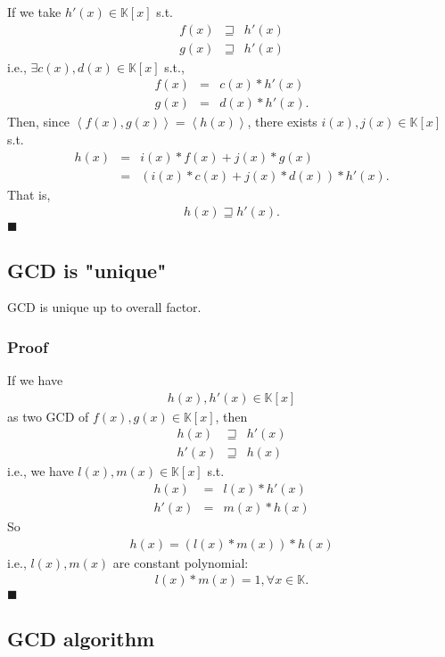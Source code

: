 \documentclass[11pt]{book}
\begin{document}
If we take $h'(x) \in \mathbb{K}[x]$ s.t.
\begin{eqnarray}
f(x) &\sqsupseteq& h'(x) \\
g(x) &\sqsupseteq& h'(x) 
\end{eqnarray}
i.e., $\exists c(x),d(x) \in \mathbb{K}[x]$ s.t.,
\begin{eqnarray}
f(x) &=& c(x) * h'(x) \\
g(x) &=& d(x) * h'(x).
\end{eqnarray}
Then, since $\left< f(x), g(x) \right> = \left< h(x)\right>$, there exists $i(x),j(x) \in \mathbb{K}[x]$ s.t.
\begin{eqnarray}
h(x) &=& i(x) * f(x) + j(x) * g(x) \\
&=& \left( i(x)*c(x) + j(x)*d(x) \right) * h'(x).
\end{eqnarray}
That is,
\begin{eqnarray}
h(x) \sqsupseteq h'(x).
\end{eqnarray}
$\blacksquare$

\subsection{GCD is "unique"}
GCD is unique up to overall factor.

\subsubsection{Proof}
If we have 
\begin{eqnarray}
h(x), h'(x) \in \mathbb{K}[x]
\end{eqnarray}
as two GCD of $f(x), g(x) \in \mathbb{K}[x]$, then
\begin{eqnarray}
h(x) &\sqsupseteq& h'(x) \\
h'(x) &\sqsupseteq& h(x)
\end{eqnarray}
i.e., we have $l(x), m(x) \in \mathbb{K}[x]$ s.t.
\begin{eqnarray}
h(x) &=& l(x) * h'(x) \\
h'(x) &=& m(x) * h(x) 
\end{eqnarray}
So
\begin{eqnarray}
h(x) = \left( l(x) * m(x) \right) * h(x)
\end{eqnarray}
i.e., $l(x),m(x)$ are constant polynomial:
\begin{eqnarray}
l(x) * m(x) = 1, \forall x \in \mathbb{K}.
\end{eqnarray}
$\blacksquare$

\subsection{GCD algorithm}
\end{document}

